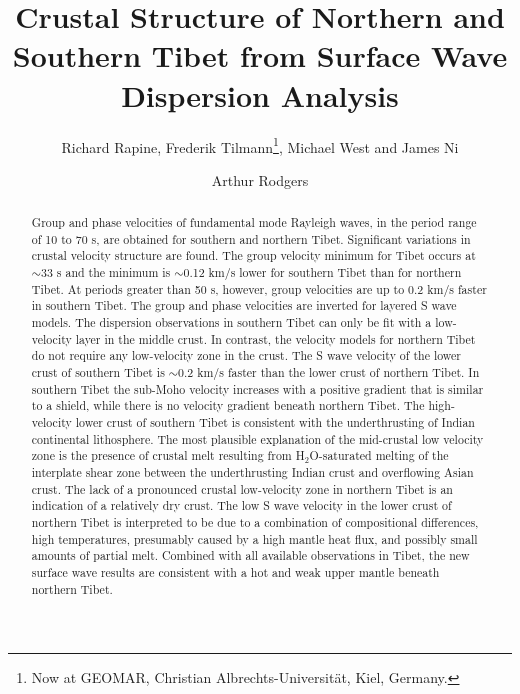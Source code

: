 \documentclass[12pt]{article}
\begin{document}
\title{Crustal Structure of Northern and Southern Tibet from  Surface Wave
Dispersion Analysis}

\author{Richard Rapine, Frederik Tilmann\footnote{Now at
GEOMAR, Christian Albrechts-Universit\"at, Kiel, Germany.},
Michael West and James Ni}

\author{Arthur Rodgers}

\begin{abstract} 

Group and phase velocities of fundamental mode Rayleigh waves, in the period range of 10 to 70 s, are 
obtained for southern and northern Tibet. Significant variations in crustal velocity structure are found. 
The group velocity minimum for Tibet occurs at $\sim$33 s and the minimum is $\sim$0.12 km/s lower for 
southern Tibet than for northern Tibet.  At periods greater than 50 s, however, group velocities are up to 
0.2 km/s faster in southern Tibet.  The group and phase velocities are inverted for layered S wave models.  
The dispersion observations in southern Tibet can only be fit with a low-velocity layer in the middle 
crust.  In contrast, the velocity models for northern Tibet do not require any low-velocity zone in the 
crust.  The S wave velocity of the lower crust of southern Tibet is $\sim$0.2 km/s faster than the lower 
crust of northern Tibet.   
In southern Tibet the sub-Moho velocity increases with a positive gradient that is similar to a shield, 
while there is no velocity gradient beneath northern Tibet.  The high-velocity lower crust of southern 
Tibet is consistent with the underthrusting of Indian continental
lithosphere. The most plausible explanation of the mid-crustal 
low velocity zone is the presence of crustal melt resulting from H$_2$O-saturated melting of the interplate 
shear zone between the underthrusting Indian crust and overflowing
Asian crust.  The lack of a pronounced 
crustal low-velocity zone in northern Tibet is an indication of a relatively dry crust.  The low S wave 
velocity in the lower crust of northern Tibet is interpreted to be
due to a combination of compositional differences, high temperatures, presumably caused by a high mantle heat flux,
and possibly small amounts of partial melt.
Combined with all available observations in Tibet, the new surface wave results are consistent with
a hot and weak upper mantle beneath northern Tibet.  \end{abstract} 
\end{document}
